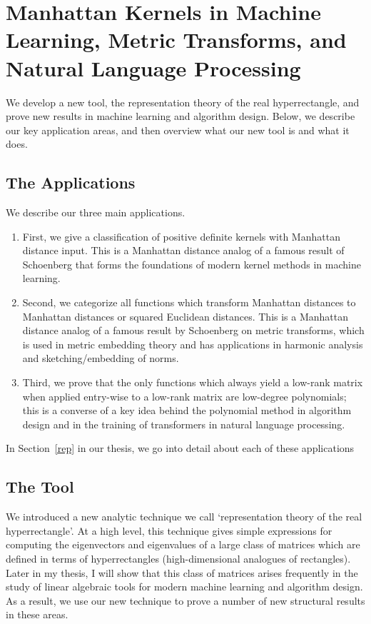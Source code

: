 \iffalse
\section{Manhattan Kernels in Machine Learning, Metric Transforms, and Natural
  Language Processing}
      We develop a new tool, the representation theory of the real
      hyperrectangle, and prove new results in machine learning and algorithm design. Below, we describe our key application
      areas, and then overview what our new tool is and what it does.
\subsection{The Applications}
We describe our three main applications. 
\begin{enumerate}
\item First, we
give a classification of positive definite kernels with Manhattan
distance input. This is a Manhattan distance analog of a famous result
of Schoenberg that forms the foundations of modern kernel methods in
machine learning. 
\item Second, we categorize all functions which transform
Manhattan distances to Manhattan distances or squared Euclidean
distances. This is a Manhattan distance analog of a famous result by
Schoenberg on metric transforms, which is used in metric embedding
theory and has applications in harmonic analysis and sketching/embedding
of norms. 
\item Third, we prove that the only functions which always yield a low-rank matrix when applied entry-wise to a low-rank matrix are low-degree polynomials; this is a converse of a key idea behind the polynomial method in algorithm design and in the training of transformers in natural language processing. 
\end{enumerate}

In Section~\ref{rep} in our thesis, we go into detail about each of
these applications

\subsection{The Tool}
We introduced a new analytic technique we call
`representation theory of the real hyperrectangle'. At a high level,
  this technique gives simple expressions for computing the eigenvectors
  and eigenvalues of a large class of matrices which are defined in
  terms of hyperrectangles (high-dimensional analogues of rectangles).
  Later in my thesis, I will show that this class of matrices arises
  frequently in the study of linear algebraic tools for modern machine
  learning and algorithm design. As a result, we use our new technique
  to prove a number of new structural results in these areas.

